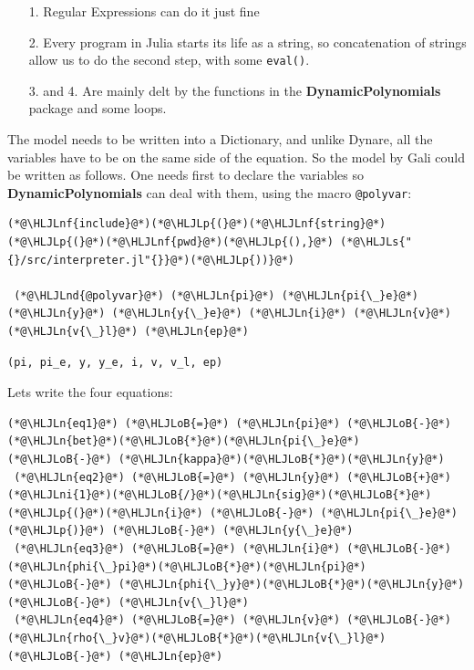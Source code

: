 \documentclass[12pt,a4paper]{article}
\newcommand{\HLJLn}[1]{#1}
\newcommand{\HLJLnd}[1]{\textcolor[RGB]{214,102,97}{#1}}
\newcommand{\HLJLnf}[1]{\textcolor[RGB]{66,102,213}{#1}}
\newcommand{\HLJLs}[1]{\textcolor[RGB]{201,61,57}{#1}}
\newcommand{\HLJLni}[1]{\textcolor[RGB]{59,151,46}{#1}}
\newcommand{\HLJLoB}[1]{\textcolor[RGB]{102,102,102}{\textbf{#1}}}
\newcommand{\HLJLp}[1]{#1}
\begin{document}
\begin{itemize}
\item[1. ] Regular Expressions can do it just fine


\item[2. ] Every program in Julia starts its life as a string, so concatenation of strings allow us to do the second step, with some \texttt{eval()}.


\item[3. ] and 4. Are mainly delt by the functions in the \textbf{DynamicPolynomials} package and some loops.

\end{itemize}
The model needs to be written into a Dictionary, and unlike Dynare, all the variables have to be on the same side of the equation. So the model by Gali could be written as follows. One needs first to declare the variables so \textbf{DynamicPolynomials} can deal with them, using the macro \texttt{@polyvar}:


\begin{lstlisting}
(*@\HLJLnf{include}@*)(*@\HLJLp{(}@*)(*@\HLJLnf{string}@*)(*@\HLJLp{(}@*)(*@\HLJLnf{pwd}@*)(*@\HLJLp{(),}@*) (*@\HLJLs{"{}/src/interpreter.jl"{}}@*)(*@\HLJLp{))}@*)

 (*@\HLJLnd{@polyvar}@*) (*@\HLJLn{pi}@*) (*@\HLJLn{pi{\_}e}@*) (*@\HLJLn{y}@*) (*@\HLJLn{y{\_}e}@*) (*@\HLJLn{i}@*) (*@\HLJLn{v}@*) (*@\HLJLn{v{\_}l}@*) (*@\HLJLn{ep}@*)
\end{lstlisting}

\begin{lstlisting}
(pi, pi_e, y, y_e, i, v, v_l, ep)
\end{lstlisting}


Lets write the four equations:


\begin{lstlisting}
(*@\HLJLn{eq1}@*) (*@\HLJLoB{=}@*) (*@\HLJLn{pi}@*) (*@\HLJLoB{-}@*) (*@\HLJLn{bet}@*)(*@\HLJLoB{*}@*)(*@\HLJLn{pi{\_}e}@*) (*@\HLJLoB{-}@*) (*@\HLJLn{kappa}@*)(*@\HLJLoB{*}@*)(*@\HLJLn{y}@*)
 (*@\HLJLn{eq2}@*) (*@\HLJLoB{=}@*) (*@\HLJLn{y}@*) (*@\HLJLoB{+}@*) (*@\HLJLni{1}@*)(*@\HLJLoB{/}@*)(*@\HLJLn{sig}@*)(*@\HLJLoB{*}@*)(*@\HLJLp{(}@*)(*@\HLJLn{i}@*) (*@\HLJLoB{-}@*) (*@\HLJLn{pi{\_}e}@*)(*@\HLJLp{)}@*) (*@\HLJLoB{-}@*) (*@\HLJLn{y{\_}e}@*)
 (*@\HLJLn{eq3}@*) (*@\HLJLoB{=}@*) (*@\HLJLn{i}@*) (*@\HLJLoB{-}@*) (*@\HLJLn{phi{\_}pi}@*)(*@\HLJLoB{*}@*)(*@\HLJLn{pi}@*) (*@\HLJLoB{-}@*) (*@\HLJLn{phi{\_}y}@*)(*@\HLJLoB{*}@*)(*@\HLJLn{y}@*) (*@\HLJLoB{-}@*) (*@\HLJLn{v{\_}l}@*)
 (*@\HLJLn{eq4}@*) (*@\HLJLoB{=}@*) (*@\HLJLn{v}@*) (*@\HLJLoB{-}@*) (*@\HLJLn{rho{\_}v}@*)(*@\HLJLoB{*}@*)(*@\HLJLn{v{\_}l}@*) (*@\HLJLoB{-}@*) (*@\HLJLn{ep}@*)
\end{lstlisting}
\end{document}
